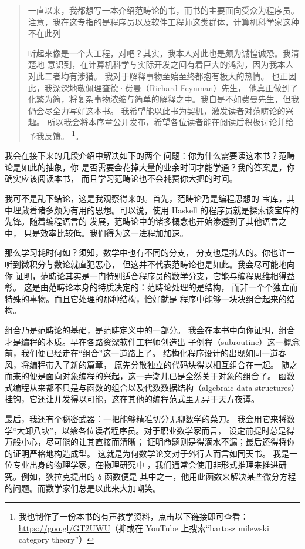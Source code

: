 
\begin{quote}
  一直以来，我都想写一本介绍范畴论的书，而书的主要面向受众为程序员。
注意，我在这专指的是程序员以及软件工程师这类群体，计算机科学家这种不在此列

听起来像是一个大工程，对吧？其实，我本人对此也是颇为诚惶诚恐。我清楚地
意识到，在计算机科学与实际开发之间有着巨大的鸿沟，因为我本人对此二者均有涉猎。
我对于解释事物至始至终都抱有极大的热情。
也正因此，我深深地敬佩理查德·费曼（Richard Feynman）先生，
他真正做到了化繁为简，将复杂事物浓缩与简单的解释之中。我自是不如费曼先生，但我仍会尽全力写好这本书。
我希望能以此书为契机，激发读者对范畴论的兴趣。
所以我会将本序章公开发布，希望各位读者能在阅读后积极讨论并给予我反馈。
\footnote{
我也制作了一份本书的有声教学资料，点击以下链接即可查看：
\href{https://goo.gl/GT2UWU}{https://goo.gl/GT2UWU}（抑或在 YouTube 上搜索“bartosz milewski category theory”）
}。
\end{quote}

\lettrine[lhang=0.17]{我}{会在}接下来的几段介绍中解决如下的两个
问题：你为什么需要读这本书？范畴论是如此的抽象，你
是否需要会花掉大量的业余时间才能学通？我的答案是，你确实应该阅读本书，
而且学习范畴论也不会耗费你大把的时间。

我可不是乱下结论，这是我观察得来的。首先，范畴论乃是编程思想的
宝库，其中埋藏着诸多颇为有用的思想。可以说，使用
 Haskell 的程序员就是探索该宝库的先锋。随着编程语言的
发展，范畴论中的诸多概念也开始渗透到了其他语言之中，
只是效率比较低。我们得为这一进程加加速。

那么学习耗时何如？须知，数学中也有不同的分支，
分支也是挑人的。你也许一听到微积分与数论就直犯恶心，
但这并不代表范畴论也是如此。我会尽可能地向你
证明，范畴论其实是一门特别适合程序员的数学分支，它能与编程思维相得益彰。
这是由范畴论本身的特质决定的：范畴论处理的是结构，
而非一个个独立而特殊的事物。而且它处理的那种结构，恰好就是
程序中能够一块块组合起来的结构。

组合乃是范畴论的基础，是范畴定义中的一部分。
我会在本书中向你证明，组合
才是编程的本质。早在各路资深软件工程师创造出
子例程（subroutine）这一概念前，我们便已经走在“组合”这一道路上了。
结构化程序设计的出现如同一道春风，将编程带入了新的篇章，
原先分散独立的代码块得以相互组合在一起。
随之而来的便是面向对象编程的兴起，这一弄潮儿已是全然关于对象的组合了。
函数式编程从来都不只是与函数的组合以及代数数据结构（algebraic data structures）
挂钩，它还让并发得以可能，这在其他的编程范式里无异于天方夜谭。


最后，我还有个秘密武器：一把能够精准切分无聊数学的菜刀。
我会用它来将数学“大卸八块”，以飨各位读者程序员。对于职业数学家而言，
设定前提时总是得万般小心，尽可能的让其直接而清晰；
证明命题则是得滴水不漏；最后还得将你的证明严格地构造成型。
这就是为何数学论文对于外行人而言如同天书。
我是一位专业出身的物理学家，在物理研究中
，我们通常会使用非形式推理来推进研究。例如，狄拉克提出的 δ 函数便是
其中之一，他用此函数来解决某些微分方程的问题。而数学家们总是以此来大加嘲笑。

